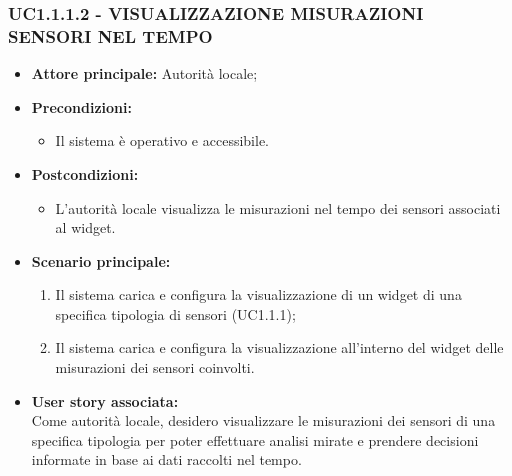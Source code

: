\subsubsection{UC1.1.1.2 - VISUALIZZAZIONE MISURAZIONI SENSORI NEL TEMPO}
\begin{itemize}
    \item \textbf{Attore principale:} Autorità locale;
    \item \textbf{Precondizioni:}
        \begin{itemize}
            \item Il sistema è operativo e accessibile.
        \end{itemize}
    \item \textbf{Postcondizioni:}
        \begin{itemize}
            \item  L'autorità locale visualizza le misurazioni nel tempo dei sensori associati al widget.
        \end{itemize}
    \item \textbf{Scenario principale:}
        \begin{enumerate}
            \item Il sistema carica e configura la visualizzazione di un widget di una specifica tipologia di sensori (UC1.1.1);
            \item Il sistema carica e configura la visualizzazione all'interno del widget delle misurazioni dei sensori coinvolti.
        \end{enumerate}
    \item \textbf{User story associata:} \\
        Come autorità locale, desidero visualizzare le misurazioni dei sensori di una specifica tipologia per poter effettuare analisi mirate e prendere decisioni informate in base ai dati raccolti nel tempo.
\end{itemize}
